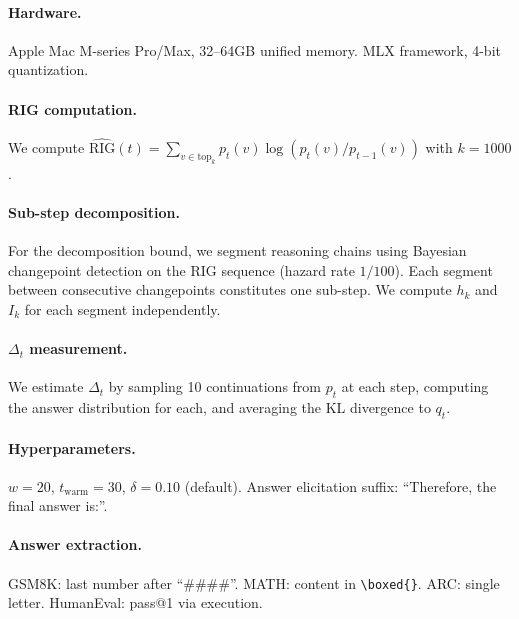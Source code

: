 \documentclass{article}
\newcommand{\RIG}{\mathrm{RIG}}
\begin{document}
\paragraph{Hardware.} Apple Mac M-series Pro/Max, 32--64GB unified memory. MLX framework, 4-bit quantization.

\paragraph{RIG computation.} We compute $\widehat{\RIG}(t) = \sum_{v \in \text{top}_k} p_t(v) \log(p_t(v)/p_{t-1}(v))$ with $k = 1000$.

\paragraph{Sub-step decomposition.} For the decomposition bound, we segment reasoning chains using Bayesian changepoint detection on the RIG sequence (hazard rate $1/100$). Each segment between consecutive changepoints constitutes one sub-step. We compute $h_k$ and $I_k$ for each segment independently.

\paragraph{$\Delta_t$ measurement.} We estimate $\Delta_t$ by sampling 10 continuations from $p_t$ at each step, computing the answer distribution for each, and averaging the KL divergence to $q_t$.

\paragraph{Hyperparameters.} $w = 20$, $t_{\text{warm}} = 30$, $\delta = 0.10$ (default). Answer elicitation suffix: ``Therefore, the final answer is:''.

\paragraph{Answer extraction.} GSM8K: last number after ``\#\#\#\#''. MATH: content in \texttt{\textbackslash boxed\{\}}. ARC: single letter. HumanEval: pass@1 via execution.

\newpage

\end{document}
